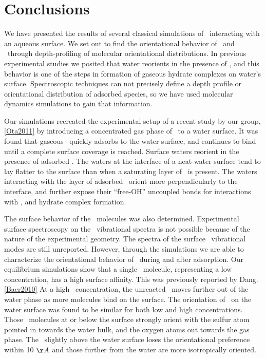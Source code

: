 \section {Conclusions}

We have presented the results of several classical simulations of \suldiox~interacting with an aqueous surface. We set out to find the orientational behavior of \wat~and \suldiox~through depth-profiling of molecular orientational distributions. In previous experimental studies we posited that water reorients in the presence of \suldiox, and this behavior is one of the steps in formation of gaseous hydrate complexes on water's surface. Spectroscopic techniques can not precisely define a depth profile or orientational distribution of adsorbed species, so we have used molecular dynamics simulations to gain that information.

Our simulations recreated the experimental setup of a recent study by our group,\ref{Ota2011} by introducing a concentrated gas phase of \suldiox~to a water surface. It was found that gaseous \suldiox~quickly adsorbs to the water surface, and continues to bind until a complete surface coverage is reached. Surface waters reorient in the presence of adsorbed \suldiox. The waters at the interface of a neat-water surface tend to lay flatter to the surface than when a saturating layer of \suldiox~is present. The waters interacting with the layer of adsorbed \suldiox~orient more perpendicularly to the interface, and further expose their ``free-OH'' uncoupled bonds for interactions with \suldiox, and hydrate complex formation.

The surface behavior of the \suldiox~molecules was also determined. Experimental surface spectroscopy on the \suldiox~vibrational spectra is not possible because of the nature of the experimental geometry. The spectra of the surface \suldiox~vibrational modes are still unreported. However, through the simulations we are able to characterize the orientational behavior of \suldiox~during and after adsorption. Our equilibrium simulations show that a single \suldiox~molecule, representing a low concentration, has a high surface affinity. This was previously reported by Dang.\ref{Baer2010} At a high \suldiox~concentration, the unreacted \suldiox~moves further out of the water phase as more molecules bind on the surface. The orientation of \suldiox~on the water surface was found to be similar for both low and high concentrations. Those \suldiox~molecules at or below the surface strongly orient with the sulfur atom pointed in towards the water bulk, and the oxygen atoms out towards the gas phase. The \suldiox~slightly above the water surface loses the orientational preference within 10 $\AA$ and those further from the water are more isotropically oriented.

